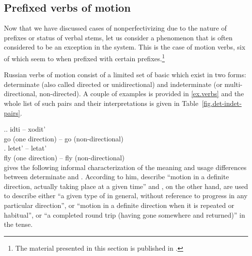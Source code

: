 \subsection{Prefixed verbs of motion}\label{subsection:perf:motion}

Now that we have discussed cases of nonperfectivizing  due to the nature of prefixes or  status of verbal stems, let us consider a phenomenon that is often considered to be an exception in the  system. This is the case of motion verbs, six of which seem to  when prefixed with certain prefixes.\footnote{The material presented in this section is published in \cite{ZinovaOsswald:paper}.}

Russian verbs of motion consist of a limited set of basic  which exist in two forms: determinate (also called directed or unidirectional) and indeterminate (or multi-directional, non-directed). A couple of examples is provided in \ref{ex.verbs} and the whole list of such pairs and their interpretations is given in Table~\ref{fig.det-indet-pairs}.

\ex.\label{ex.verbs}\ag. idti -- xodit'\\
{go (one direction)} -- {go (non-directional)}\\
\bg. letet' -- letat'\\
{fly (one direction)} -- {fly (non-directional)}\\

\citet[3f]{Stilman:51} gives the following informal characterization of the meaning and usage differences between determinate and . According to him,  describe ``motion in a definite direction, actually taking place at a given time'' and , on the other hand, are used to describe either ``a given type of  in general, without reference to progress in any particular direction'', or ``motion in a definite direction when it is repeated or habitual'', or ``a completed round trip (having gone somewhere and returned)'' in the  tense.

